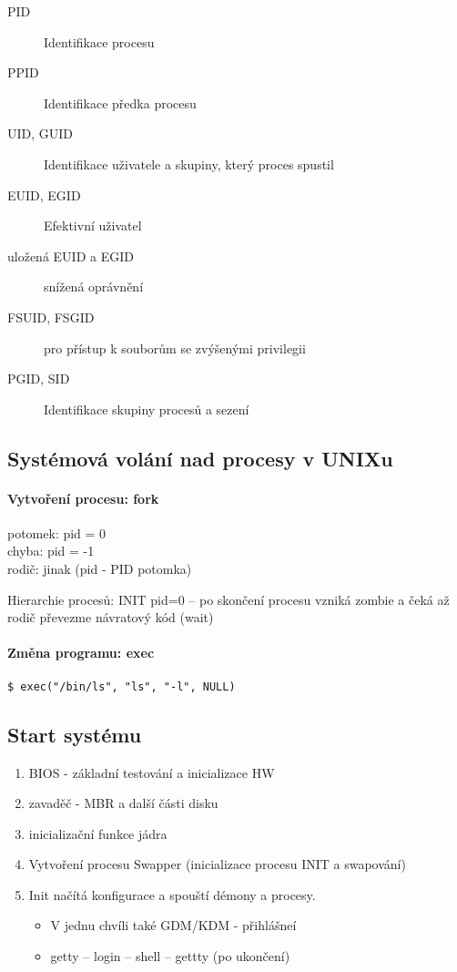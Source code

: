 \documentclass[a4wide]{report}
\begin{document}
\begin{description}
	\item[PID] Identifikace procesu
	\item[PPID] Identifikace předka procesu
	\item[UID, GUID] Identifikace uživatele a skupiny, který proces spustil
	\item[EUID, EGID] Efektivní uživatel
	\item[uložená EUID a EGID] snížená oprávnění
	\item[FSUID, FSGID] pro přístup k souborům se zvýšenými privilegii
	\item[PGID, SID] Identifikace skupiny procesů a sezení
\end{description}

\subsection{Systémová volání nad procesy v UNIXu}

\paragraph{Vytvoření procesu: fork}

potomek: pid = 0\\
chyba: pid = -1\\
rodič: jinak (pid - PID potomka)

Hierarchie procesů: INIT pid=0 -- po skončení procesu vzniká zombie a čeká až rodič převezme návratový kód (wait)

\paragraph{Změna programu: exec}

\verb|$ exec("/bin/ls", "ls", "-l", NULL)|

\subsection{Start systému}
\begin{enumerate}
	\item BIOS - základní testování a inicializace HW
	\item zavaděč - MBR a další části disku
	\item inicializační funkce jádra
	\item Vytvoření procesu Swapper (inicializace procesu INIT a swapování)
	\item Init načítá konfigurace a spouští démony a procesy.
	\begin{itemize}
		\item V jednu chvíli také GDM/KDM - přihlášneí
		\item getty -- login -- shell -- gettty (po ukončení)
	\end{itemize}
\end{enumerate}
\end{document}
